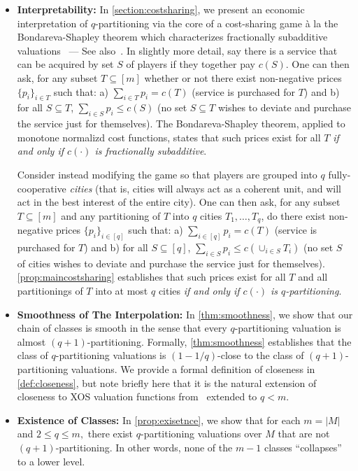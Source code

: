\documentclass[11pt]{article}\usepackage{amsfonts}
\numberwithin{theorem}{subsection}
\begin{document}
\begin{itemize}[noitemsep]
    \item \textbf{Interpretability:} In \cref{section:costsharing}, we present an economic interpretation of $q$-partitioning via the core of a cost-sharing game \`{a} la the Bondareva-Shapley theorem which characterizes fractionally subadditive valuations~\cite{Bondareva63,Shapley67} --- See also~\cite[Theorem~15.6]{AGTbook}. In slightly more detail, say there is a service that can be acquired by set $S$ of players if they together pay $c(S)$. One can then ask, for any subset $T \subseteq [m]$ whether or not there exist non-negative prices $\{p_i\}_{i \in T}$ such that: a) $\sum_{i \in T} p_i = c(T)$ (service is purchased for $T$) and b) for all $S\subseteq T$, $\sum_{i \in S} p_i \leq c(S)$ (no set $S\subseteq T$ wishes to deviate and purchase the service just for themselves). The Bondareva-Shapley theorem, applied to monotone normalizd cost functions, states that such prices exist for all $T$ \emph{if and only if $c(\cdot)$ is fractionally subadditive}. 

    Consider instead modifying the game so that players are grouped into $q$ fully-cooperative \emph{cities} (that is, cities will always act as a coherent unit, and will act in the best interest of the entire city). One can then ask, for any subset $T \subseteq [m]$ and any partitioning of $T$ into $q$ cities $T_1,\ldots, T_q$, do there exist non-negative prices $\{p_i\}_{i \in [q]}$ such that: a) $\sum_{i \in [q]} p_i = c(T)$ (service is purchased for $T$) and b) for all $S \subseteq [q]$, $\sum_{i \in S} p_i \leq c(\cup_{i \in S} T_i)$ (no set $S$ of cities wishes to deviate and purchase the service just for themselves). \cref{prop:maincostsharing} establishes that such prices exist for all $T$ and all partitionings of $T$ into at most $q$ cities \emph{if and only if $c(\cdot)$ is $q$-partitioning}.
    \item \textbf{Smoothness of The Interpolation:} In \cref{thm:smoothness}, we show that our chain of classes is smooth in the sense that every $q$-partitioning valuation is almost $(q+1)$-partitioning. Formally, \cref{thm:smoothness} establishes that the class of $q$-partitioning valuations is $(1-1/q)$-close to the class of $(q+1)$-partitioning valuations. We provide a formal definition of closeness in \cref{def:closeness}, but note briefly here that it is the natural extension of closeness to XOS valuation functions from~\cite{BhawalkarR11} extended to $q < m$.
    
\item \textbf{Existence of Classes:} In \cref{prop:exisetnce}, we show that for each $m = |M|$ and $2\le q \le m,$ there exist $q$-partitioning valuations over $M$ that are not $(q+1)$-partitioning. In other words, none of the $m-1$ classes ``collapses'' to a lower level.
\end{itemize}
\end{document}
